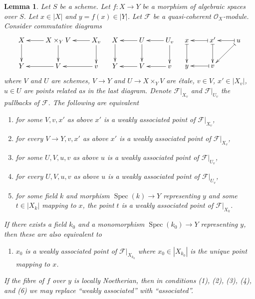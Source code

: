 \documentclass{stacks-project}
\theoremstyle{plain}
\newtheorem{lemma}[subsection]{Lemma}
\theoremstyle{definition}
\theoremstyle{remark}
\numberwithin{equation}{subsection}
\def\Spec{\mathop{\mathrm{Spec}}}
\begin{document}
\begin{lemma}
\label{lemma-relative-assassin}
Let $S$ be a scheme. Let $f : X \to Y$ be a morphism of algebraic spaces
over $S$. Let $x \in |X|$ and $y = f(x) \in |Y|$.
Let $\mathcal{F}$ be a quasi-coherent
$\mathcal{O}_X$-module. Consider commutative diagrams
$$
\xymatrix{
X \ar[d] & X \times_Y V \ar[d] \ar[l] & X_v \ar[d] \ar[l] \\
Y & V \ar[l] & v \ar[l]
}
\quad
\xymatrix{
X \ar[d] & U \ar[d] \ar[l] & U_v \ar[d] \ar[l] \\
Y & V \ar[l] & v \ar[l]
}
\quad
\xymatrix{
x \ar@{|->}[d] &
x' \ar@{|->}[d] \ar@{|->}[l] &
u \ar@{|->}[ld] \ar@{|->}[l] \\
y &
v \ar@{|->}[l]
}
$$
where $V$ and $U$ are schemes, $V \to Y$ and $U \to X \times_Y V$
are \'etale, $v \in V$, $x' \in |X_v|$, $u \in U$ are points
related as in the last diagram.
Denote $\mathcal{F}|_{X_v}$ and $\mathcal{F}|_{U_v}$
the pullbacks of $\mathcal{F}$.
The following are equivalent
\begin{enumerate}
\item for some $V, v, x'$ as above $x'$ is a weakly associated
point of $\mathcal{F}|_{X_v}$,
\item for every $V \to Y, v, x'$ as above $x'$ is a weakly associated
point of $\mathcal{F}|_{X_v}$,
\item for some $U, V, u, v$ as above $u$ is a weakly associated
point of $\mathcal{F}|_{U_v}$,
\item for every $U, V, u, v$ as above $u$ is a weakly associated
point of $\mathcal{F}|_{U_v}$,
\item for some field $k$ and morphism $\Spec(k) \to Y$ representing $y$
and some $t \in |X_k|$ mapping to $x$, the point $t$ is a weakly
associated point of $\mathcal{F}|_{X_k}$.
\end{enumerate}
If there exists a field $k_0$ and a monomorphism $\Spec(k_0) \to Y$
representing $y$, then these are also equivalent to
\begin{enumerate}
\item[(6)] $x_0$ is a weakly associated point of $\mathcal{F}|_{X_{k_0}}$
where $x_0 \in |X_{k_0}|$ is the unique point mapping to $x$.
\end{enumerate}
If the fibre of $f$ over $y$ is locally Noetherian, then in
conditions (1), (2), (3), (4), and (6) we may replace
``weakly associated'' with ``associated''.
\end{lemma}
\end{document}
